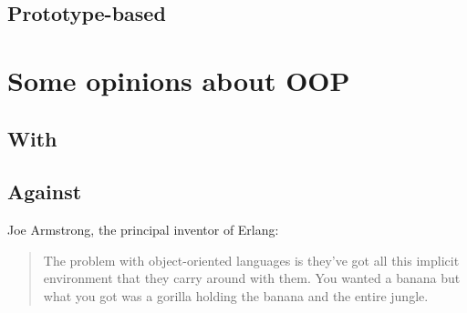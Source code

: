 \documentclass[12pt]{book}
\begin{document}
\subsection{Prototype-based}
	
\section{Some opinions about OOP}

\subsection{With}

\subsection{Against}

Joe Armstrong, the principal inventor of Erlang:
\begin{quote}
The problem with object-oriented languages is they've got all this implicit environment that they carry around with them. 
You wanted a banana but what you got was a gorilla holding the banana and the entire jungle.
\end{quote}


\ifx\wholebook\relax\else
% 
% 
	
\end{document}
